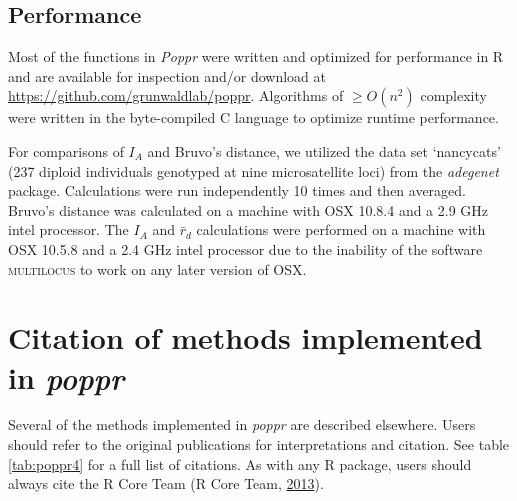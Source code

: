 \documentclass[double,11pt]{beavtex}
\begin{document}
  \subsection{Performance}\label{performance}
  
  Most of the functions in \emph{Poppr} were written and optimized for
  performance in R and are available for inspection and/or download at
  \url{https://github.com/grunwaldlab/poppr}. Algorithms of
  \(\geq O(n^2)\) complexity were written in the byte-compiled C language
  to optimize runtime performance.
  
  For comparisons of \(I_A\) and Bruvo's distance, we utilized the data
  set `nancycats' (237 diploid individuals genotyped at nine
  microsatellite loci) from the \emph{adegenet} package. Calculations were
  run independently 10 times and then averaged. Bruvo's distance was
  calculated on a machine with OSX 10.8.4 and a 2.9 GHz intel processor.
  The \(I_A\) and \(\bar{r}_d\) calculations were performed on a machine
  with OSX 10.5.8 and a 2.4 GHz intel processor due to the inability of
  the software \textsc{multilocus} to work on any later version of OSX.
  
  \section{\texorpdfstring{Citation of methods implemented in
  \emph{poppr}}{Citation of methods implemented in poppr}}\label{citation-of-methods-implemented-in-poppr}
  
  Several of the methods implemented in \emph{poppr} are described
  elsewhere. Users should refer to the original publications for
  interpretations and citation. See table \ref{tab:poppr4} for a full list
  of citations. As with any R package, users should always cite the R Core
  Team (R Core Team, \protect\hyperlink{ref-R2013}{2013}).
  
\end{document}
